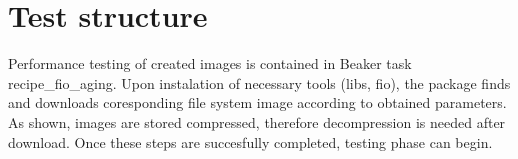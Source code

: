 \documentclass[
  color, %
  table, %
  lof,   %
  lot,   %
]{fithesis3}
\begin{document}







\section{Test structure}
Performance testing of created images is contained in Beaker task recipe\_fio\_aging. Upon instalation of necessary tools (libs, fio), the package finds and downloads coresponding file system image according to obtained parameters. As shown, images are stored compressed, therefore decompression is needed after download. Once these steps are succesfully completed, testing phase can begin.
\end{document}
